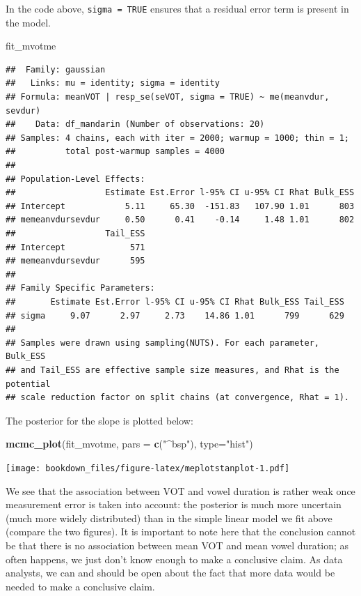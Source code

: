 \documentclass[12pt,]{krantz}
\newenvironment{Shaded}{\begin{snugshade}}{\end{snugshade}}
\newcommand{\DataTypeTok}[1]{\textcolor[rgb]{0.13,0.29,0.53}{#1}}
\newcommand{\KeywordTok}[1]{\textcolor[rgb]{0.13,0.29,0.53}{\textbf{#1}}}
\newcommand{\NormalTok}[1]{#1}
\newcommand{\StringTok}[1]{\textcolor[rgb]{0.31,0.60,0.02}{#1}}
\theoremstyle{definition}
\theoremstyle{definition}
\theoremstyle{definition}
\theoremstyle{remark}
\begin{document}
In the code above, \texttt{sigma\ =\ TRUE} ensures that a residual error term is present in the model.

\begin{Shaded}
\begin{Highlighting}[]
\NormalTok{fit_mvotme}
\end{Highlighting}
\end{Shaded}

\begin{verbatim}
##  Family: gaussian 
##   Links: mu = identity; sigma = identity 
## Formula: meanVOT | resp_se(seVOT, sigma = TRUE) ~ me(meanvdur, sevdur) 
##    Data: df_mandarin (Number of observations: 20) 
## Samples: 4 chains, each with iter = 2000; warmup = 1000; thin = 1;
##          total post-warmup samples = 4000
## 
## Population-Level Effects: 
##                  Estimate Est.Error l-95% CI u-95% CI Rhat Bulk_ESS
## Intercept            5.11     65.30  -151.83   107.90 1.01      803
## memeanvdursevdur     0.50      0.41    -0.14     1.48 1.01      802
##                  Tail_ESS
## Intercept             571
## memeanvdursevdur      595
## 
## Family Specific Parameters: 
##       Estimate Est.Error l-95% CI u-95% CI Rhat Bulk_ESS Tail_ESS
## sigma     9.07      2.97     2.73    14.86 1.01      799      629
## 
## Samples were drawn using sampling(NUTS). For each parameter, Bulk_ESS
## and Tail_ESS are effective sample size measures, and Rhat is the potential
## scale reduction factor on split chains (at convergence, Rhat = 1).
\end{verbatim}

The posterior for the slope is plotted below:

\begin{Shaded}
\begin{Highlighting}[]
\KeywordTok{mcmc_plot}\NormalTok{(fit_mvotme, }\DataTypeTok{pars =} \KeywordTok{c}\NormalTok{(}\StringTok{"^bsp"}\NormalTok{), }\DataTypeTok{type=}\StringTok{"hist"}\NormalTok{)}
\end{Highlighting}
\end{Shaded}

\texttt{[image: bookdown\_files/figure-latex/meplotstanplot-1.pdf]}

We see that the association between VOT and vowel duration is rather weak once measurement error is taken into account: the posterior is much more uncertain (much more widely distributed) than in the simple linear model we fit above (compare the two figures). It is important to note here that the conclusion cannot be that there is no association between mean VOT and mean vowel duration; as often happens, we just don't know enough to make a conclusive claim. As data analysts, we can and should be open about the fact that more data would be needed to make a conclusive claim.
\end{document}
